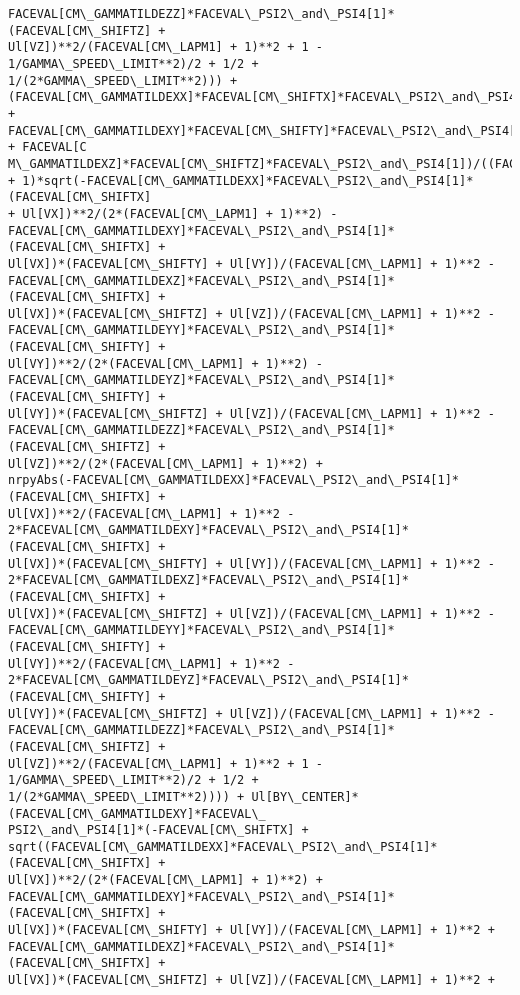 \documentclass[landscape,letterpaper,10pt,english]{article}
\begin{document}
\begin{Verbatim}[commandchars=\\\{\}]
FACEVAL[CM\_GAMMATILDEZZ]*FACEVAL\_PSI2\_and\_PSI4[1]*(FACEVAL[CM\_SHIFTZ] +
Ul[VZ])**2/(FACEVAL[CM\_LAPM1] + 1)**2 + 1 - 1/GAMMA\_SPEED\_LIMIT**2)/2 + 1/2 +
1/(2*GAMMA\_SPEED\_LIMIT**2))) +
(FACEVAL[CM\_GAMMATILDEXX]*FACEVAL[CM\_SHIFTX]*FACEVAL\_PSI2\_and\_PSI4[1] +
FACEVAL[CM\_GAMMATILDEXY]*FACEVAL[CM\_SHIFTY]*FACEVAL\_PSI2\_and\_PSI4[1] + FACEVAL[C
M\_GAMMATILDEXZ]*FACEVAL[CM\_SHIFTZ]*FACEVAL\_PSI2\_and\_PSI4[1])/((FACEVAL[CM\_LAPM1]
+ 1)*sqrt(-FACEVAL[CM\_GAMMATILDEXX]*FACEVAL\_PSI2\_and\_PSI4[1]*(FACEVAL[CM\_SHIFTX]
+ Ul[VX])**2/(2*(FACEVAL[CM\_LAPM1] + 1)**2) -
FACEVAL[CM\_GAMMATILDEXY]*FACEVAL\_PSI2\_and\_PSI4[1]*(FACEVAL[CM\_SHIFTX] +
Ul[VX])*(FACEVAL[CM\_SHIFTY] + Ul[VY])/(FACEVAL[CM\_LAPM1] + 1)**2 -
FACEVAL[CM\_GAMMATILDEXZ]*FACEVAL\_PSI2\_and\_PSI4[1]*(FACEVAL[CM\_SHIFTX] +
Ul[VX])*(FACEVAL[CM\_SHIFTZ] + Ul[VZ])/(FACEVAL[CM\_LAPM1] + 1)**2 -
FACEVAL[CM\_GAMMATILDEYY]*FACEVAL\_PSI2\_and\_PSI4[1]*(FACEVAL[CM\_SHIFTY] +
Ul[VY])**2/(2*(FACEVAL[CM\_LAPM1] + 1)**2) -
FACEVAL[CM\_GAMMATILDEYZ]*FACEVAL\_PSI2\_and\_PSI4[1]*(FACEVAL[CM\_SHIFTY] +
Ul[VY])*(FACEVAL[CM\_SHIFTZ] + Ul[VZ])/(FACEVAL[CM\_LAPM1] + 1)**2 -
FACEVAL[CM\_GAMMATILDEZZ]*FACEVAL\_PSI2\_and\_PSI4[1]*(FACEVAL[CM\_SHIFTZ] +
Ul[VZ])**2/(2*(FACEVAL[CM\_LAPM1] + 1)**2) +
nrpyAbs(-FACEVAL[CM\_GAMMATILDEXX]*FACEVAL\_PSI2\_and\_PSI4[1]*(FACEVAL[CM\_SHIFTX] +
Ul[VX])**2/(FACEVAL[CM\_LAPM1] + 1)**2 -
2*FACEVAL[CM\_GAMMATILDEXY]*FACEVAL\_PSI2\_and\_PSI4[1]*(FACEVAL[CM\_SHIFTX] +
Ul[VX])*(FACEVAL[CM\_SHIFTY] + Ul[VY])/(FACEVAL[CM\_LAPM1] + 1)**2 -
2*FACEVAL[CM\_GAMMATILDEXZ]*FACEVAL\_PSI2\_and\_PSI4[1]*(FACEVAL[CM\_SHIFTX] +
Ul[VX])*(FACEVAL[CM\_SHIFTZ] + Ul[VZ])/(FACEVAL[CM\_LAPM1] + 1)**2 -
FACEVAL[CM\_GAMMATILDEYY]*FACEVAL\_PSI2\_and\_PSI4[1]*(FACEVAL[CM\_SHIFTY] +
Ul[VY])**2/(FACEVAL[CM\_LAPM1] + 1)**2 -
2*FACEVAL[CM\_GAMMATILDEYZ]*FACEVAL\_PSI2\_and\_PSI4[1]*(FACEVAL[CM\_SHIFTY] +
Ul[VY])*(FACEVAL[CM\_SHIFTZ] + Ul[VZ])/(FACEVAL[CM\_LAPM1] + 1)**2 -
FACEVAL[CM\_GAMMATILDEZZ]*FACEVAL\_PSI2\_and\_PSI4[1]*(FACEVAL[CM\_SHIFTZ] +
Ul[VZ])**2/(FACEVAL[CM\_LAPM1] + 1)**2 + 1 - 1/GAMMA\_SPEED\_LIMIT**2)/2 + 1/2 +
1/(2*GAMMA\_SPEED\_LIMIT**2)))) + Ul[BY\_CENTER]*(FACEVAL[CM\_GAMMATILDEXY]*FACEVAL\_
PSI2\_and\_PSI4[1]*(-FACEVAL[CM\_SHIFTX] +
sqrt((FACEVAL[CM\_GAMMATILDEXX]*FACEVAL\_PSI2\_and\_PSI4[1]*(FACEVAL[CM\_SHIFTX] +
Ul[VX])**2/(2*(FACEVAL[CM\_LAPM1] + 1)**2) +
FACEVAL[CM\_GAMMATILDEXY]*FACEVAL\_PSI2\_and\_PSI4[1]*(FACEVAL[CM\_SHIFTX] +
Ul[VX])*(FACEVAL[CM\_SHIFTY] + Ul[VY])/(FACEVAL[CM\_LAPM1] + 1)**2 +
FACEVAL[CM\_GAMMATILDEXZ]*FACEVAL\_PSI2\_and\_PSI4[1]*(FACEVAL[CM\_SHIFTX] +
Ul[VX])*(FACEVAL[CM\_SHIFTZ] + Ul[VZ])/(FACEVAL[CM\_LAPM1] + 1)**2 +

\end{Verbatim}
\end{document}
